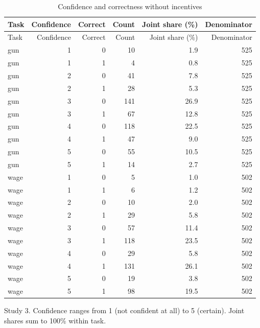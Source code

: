 
\begin{longtable}[t]{lrrrrr}
\caption{\label{tab:confidence}Confidence and correctness without incentives}\\
\toprule
Task & Confidence & Correct & Count & Joint share (\%) & Denominator\\
\midrule
\endfirsthead
\toprule
Task & Confidence & Correct & Count & Joint share (\%) & Denominator\\
\midrule
\endhead
gun & 1 & 0 & 10 & 1.9 & 525\\
gun & 1 & 1 & 4 & 0.8 & 525\\
gun & 2 & 0 & 41 & 7.8 & 525\\
gun & 2 & 1 & 28 & 5.3 & 525\\
gun & 3 & 0 & 141 & 26.9 & 525\\
gun & 3 & 1 & 67 & 12.8 & 525\\
gun & 4 & 0 & 118 & 22.5 & 525\\
gun & 4 & 1 & 47 & 9.0 & 525\\
gun & 5 & 0 & 55 & 10.5 & 525\\
gun & 5 & 1 & 14 & 2.7 & 525\\
wage & 1 & 0 & 5 & 1.0 & 502\\
wage & 1 & 1 & 6 & 1.2 & 502\\
wage & 2 & 0 & 10 & 2.0 & 502\\
wage & 2 & 1 & 29 & 5.8 & 502\\
wage & 3 & 0 & 57 & 11.4 & 502\\
wage & 3 & 1 & 118 & 23.5 & 502\\
wage & 4 & 0 & 29 & 5.8 & 502\\
wage & 4 & 1 & 131 & 26.1 & 502\\
wage & 5 & 0 & 19 & 3.8 & 502\\
wage & 5 & 1 & 98 & 19.5 & 502\\
\bottomrule
\end{longtable}
\noindent\footnotesize Study 3. Confidence ranges from 1 (not confident at all) to 5 (certain). Joint shares sum to 100\% within task.\par\normalsize
